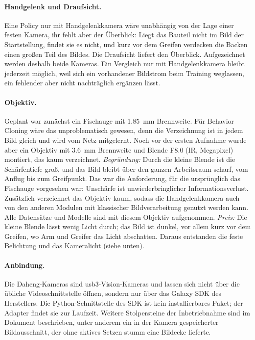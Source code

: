 \paragraph{Handgelenk und Draufsicht.} Eine Policy nur mit Handgelenkkamera wäre unabhängig
von der Lage einer festen Kamera, ihr fehlt aber der Überblick: Liegt das Bauteil nicht im
Bild der Startstellung, findet sie es nicht, und kurz vor dem Greifen verdecken die Backen
einen großen Teil des Bildes. Die Draufsicht liefert den Überblick. Aufgezeichnet werden
deshalb beide Kameras. Ein Vergleich nur mit Handgelenkkamera bleibt jederzeit möglich, weil
sich ein vorhandener Bildstrom beim Training weglassen, ein fehlender aber nicht nachträglich
ergänzen lässt.

\paragraph{Objektiv.} Geplant war zunächst ein Fischauge mit \SI{1.85}{\milli\metre}
Brennweite. Für Behavior Cloning wäre das unproblematisch gewesen, denn die Verzeichnung ist
in jedem Bild gleich und wird vom Netz mitgelernt. Noch vor der ersten Aufnahme wurde aber ein
Objektiv mit \SI{3.6}{\milli\metre} Brennweite und Blende F8.0 (IR, Megapixel) montiert, das
kaum verzeichnet. \emph{Begründung:} Durch die kleine Blende ist die Schärfentiefe groß, und
das Bild bleibt über den ganzen Arbeitsraum scharf, vom Anflug bis zum Greifpunkt. Das war die
Anforderung, für die ursprünglich das Fischauge vorgesehen war: Unschärfe ist
unwiederbringlicher Informationsverlust. Zusätzlich verzeichnet das Objektiv kaum, sodass die
Handgelenkkamera auch von den anderen Modulen mit klassischer Bildverarbeitung genutzt werden
kann. Alle Datensätze und Modelle sind mit diesem Objektiv aufgenommen.
\emph{Preis:} Die kleine Blende lässt wenig Licht durch; das Bild ist dunkel, vor allem
kurz vor dem Greifen, wo Arm und Greifer das Licht abschatten. Daraus
entstanden die feste Belichtung und das Kameralicht (siehe unten).


\paragraph{Anbindung.} Die Daheng-Kameras sind \acs{usb}3-Vision-Kameras und lassen sich nicht
über die übliche Videoschnittstelle öffnen, sondern nur über das Galaxy SDK des Herstellers.
Die Python-Schnittstelle des SDK ist kein installierbares Paket; der Adapter findet sie zur
Laufzeit. Weitere Stolpersteine der Inbetriebnahme sind im Dokument
 beschrieben, unter anderem ein in der Kamera
gespeicherter Bildausschnitt, der ohne aktives Setzen stumm eine Bildecke lieferte.


